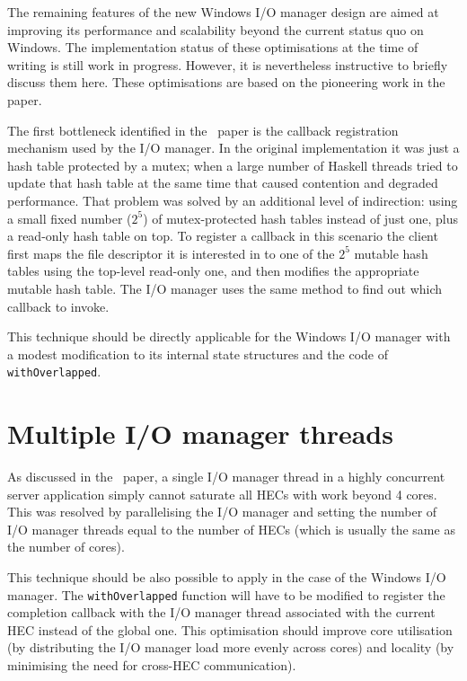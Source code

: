 \documentclass[a4paper,11pt,oneside]{report}
\begin{document}
The remaining features of the new Windows I/O manager design are aimed at
improving its performance and scalability beyond the current status quo on
Windows. The implementation status of these optimisations at the time of writing
is still work in progress. However, it is nevertheless instructive to briefly
discuss them here. These optimisations are based on the pioneering work in
the~\cite{bib:voellmy} paper.

The first bottleneck identified in the~\cite{bib:voellmy} paper is the callback
registration mechanism used by the I/O manager. In the original implementation
it was just a hash table protected by a mutex; when a large number of Haskell
threads tried to update that hash table at the same time that caused contention
and degraded performance. That problem was solved by an additional level of
indirection: using a small fixed number ($2^5$) of mutex-protected hash tables
instead of just one, plus a read-only hash table on top. To register a callback
in this scenario the client first maps the file descriptor it is interested in
to one of the $2^5$ mutable hash tables using the top-level read-only one, and
then modifies the appropriate mutable hash table. The I/O manager uses the same
method to find out which callback to invoke.

This technique should be directly applicable for the Windows I/O manager with a
modest modification to its internal state structures and the code of
\texttt{withOverlapped}.

\section{Multiple I/O manager threads}

As discussed in the~\cite{bib:voellmy} paper, a single I/O manager thread in a
highly concurrent server application simply cannot saturate all HECs with work
beyond 4 cores. This was resolved by parallelising the I/O manager and setting
the number of I/O manager threads equal to the number of HECs (which is usually
the same as the number of cores).

This technique should be also possible to apply in the case of the Windows I/O
manager. The \texttt{withOverlapped} function will have to be modified to
register the completion callback with the I/O manager thread associated with the
current HEC instead of the global one. This optimisation should improve core
utilisation (by distributing the I/O manager load more evenly across cores) and
locality (by minimising the need for cross-HEC communication).
\end{document}
